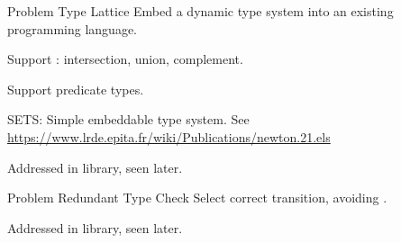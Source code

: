 \begin{frame}{Problem }{Type Lattice}
  Embed a dynamic type system into an existing programming language.

  \medskip
  
  Support : intersection, union, complement.

  \medskip
  
  Support predicate types.

  \medskip  

  SETS: Simple embeddable type system.
  See \url{https://www.lrde.epita.fr/wiki/Publications/newton.21.els}

  \medskip
  
  Addressed in  library, seen later.
\end{frame}


\begin{frame}{Problem }{Redundant Type Check}
  Select correct transition, avoiding .

  \medskip

  \scalebox{0.85}{}

  \medskip
  
  Addressed in  library, seen later.
\end{frame}

